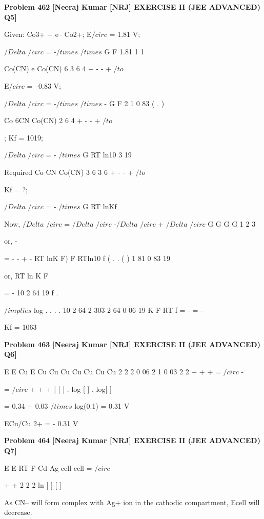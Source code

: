 \begin{problembox}
\textbf{Problem 462} \hfill \textbf{[Neeraj Kumar [NRJ] EXERCISE II (JEE ADVANCED) Q5]}
\label{q:ext-nrj_all_questions-462}

Given: Co3+ + e-- 
 Co2+; E$/circ$ = 1.81 V; 
 
 
$/Delta$
$/circ$ = -$/times$
$/times$
G
F 1.81
1
1
 
 
Co(CN)
e
Co(CN)
6
3
6
4
+
-
-
+
 $/to$
 
 E$/circ$ = --0.83 V; 
 
 
$/Delta$
$/circ$ = -$/times$
$/times$ -
G
F
2
1
0 83
(
.
)
 
 
Co
6CN
Co(CN)
2
6
4
+
-
-
+
 $/to$
 
; Kf = 1019; 
 
 
$/Delta$
$/circ$ = -
$/times$
G
RT
ln10
3
19
 
 Required Co
CN
Co(CN)
3
6
3
6
+
-
-
+
 $/to$
 
 Kf = ?; 
 
 
$/Delta$
$/circ$ = -
$/times$
G
RT
lnKf
 
 Now, $/Delta$
$/circ$ = $/Delta$
$/circ$ -$/Delta$
$/circ$ + $/Delta$
$/circ$
G
G
G
G
1
2
3
 
 or, -
 
= -
-
+ -
RT lnK
F)
F
RTln10
f
(
.
.
(
)
1 81
0 83
19
 
 or, RT ln K
F
 
= -
10
2 64
19
f
.
 
 
 $/implies$ log
.
.
.
.
10
2 64
2 303
2 64
0 06
19
K
F
RT
f
= -
= -
 
   Kf = 1063
\end{problembox}

\begin{problembox}
\textbf{Problem 463} \hfill \textbf{[Neeraj Kumar [NRJ] EXERCISE II (JEE ADVANCED) Q6]}
\label{q:ext-nrj_all_questions-463}

E
E
Cu
E
Cu
Cu
Cu
Cu
Cu
Cu
Cu
2
2
2
0 06
2
1
0 03
2
2
+
+
+
=
$/circ$
-
 
=
$/circ$
+
+
+
|
|
|
.
log
[
]
.
log[
]
 
 = 0.34 + 0.03 $/times$ log(0.1) = 0.31 V
 
   ECu/Cu
2+ = - 0.31 V
\end{problembox}

\begin{problembox}
\textbf{Problem 464} \hfill \textbf{[Neeraj Kumar [NRJ] EXERCISE II (JEE ADVANCED) Q7]}
\label{q:ext-nrj_all_questions-464}

E
E
RT
F
Cd
Ag
cell
cell
=
$/circ$
-
 
+
+
2
2
2
ln [
]
[
]
 
 As CN-- will form complex with Ag+ ion in the 
cathodic compartment, Ecell will decrease.
\end{problembox}

